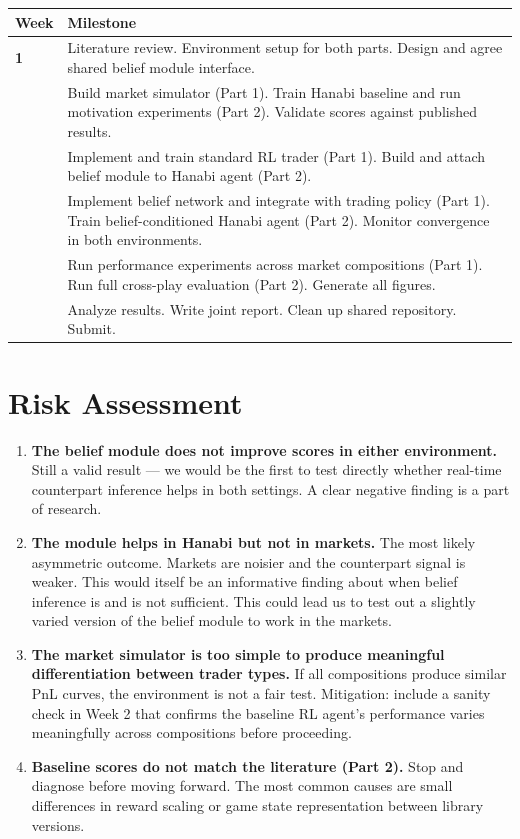 \documentclass[11pt, a4paper]{article}
\begin{document}
\begin{center}
\begin{tabular}{>{\bfseries}p{2.2cm} p{10.5cm}}
\toprule
\textbf{Week} & \textbf{Milestone} \\
\midrule
1 & Literature review. Environment setup for both parts. Design and agree shared belief module interface. \\
\addlinespace
2 & Build market simulator (Part 1). Train Hanabi baseline and run motivation experiments (Part 2). Validate scores against published results. \\
\addlinespace
3 & Implement and train standard RL trader (Part 1). Build and attach belief module to Hanabi agent (Part 2). \\
\addlinespace
4 & Implement belief network and integrate with trading policy (Part 1). Train belief-conditioned Hanabi agent (Part 2). Monitor convergence in both environments. \\
\addlinespace
5 & Run performance experiments across market compositions (Part 1). Run full cross-play evaluation (Part 2). Generate all figures. \\
\addlinespace
6 & Analyze results. Write joint report. Clean up shared repository. Submit. \\
\bottomrule
\end{tabular}
\end{center}

\section{Risk Assessment}

\begin{enumerate}[leftmargin=*, label=\textbf{\arabic*.}]
    \item \textbf{The belief module does not improve scores in either environment.} Still a valid result --- we would be the first to test directly whether real-time counterpart inference helps in both settings. A clear negative finding is a part of research.
    \item \textbf{The module helps in Hanabi but not in markets.} The most likely asymmetric outcome. Markets are noisier and the counterpart signal is weaker. This would itself be an informative finding about when belief inference is and is not sufficient. This could lead us to test out a slightly varied version of the belief module to work in the markets.
    \item \textbf{The market simulator is too simple to produce meaningful differentiation between trader types.} If all compositions produce similar PnL curves, the environment is not a fair test. Mitigation: include a sanity check in Week 2 that confirms the baseline RL agent's performance varies meaningfully across compositions before proceeding.
    \item \textbf{Baseline scores do not match the literature (Part 2).} Stop and diagnose before moving forward. The most common causes are small differences in reward scaling or game state representation between library versions.
\end{enumerate}
\end{document}
